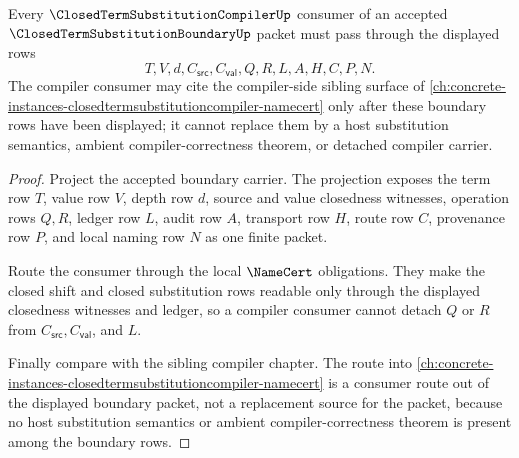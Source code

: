 \begin{theorem}
\label{thm:closed-term-substitution-boundary-compiler-consumer-lock}
Every $\ClosedTermSubstitutionCompilerUp$ consumer of an accepted $\ClosedTermSubstitutionBoundaryUp$ packet must pass through the displayed rows
$$
T,V,d,C_{\mathsf{src}},C_{\mathsf{val}},Q,R,L,A,H,C,P,N.
$$
The compiler consumer may cite the compiler-side sibling surface of \autoref{ch:concrete-instances-closedtermsubstitutioncompiler-namecert} only after these boundary rows have been displayed; it cannot replace them by a host substitution semantics, ambient compiler-correctness theorem, or detached compiler carrier.
\end{theorem}
\begin{proof}
Project the accepted boundary carrier. The projection exposes the term row $T$, value row $V$, depth row $d$, source and value closedness witnesses, operation rows $Q,R$, ledger row $L$, audit row $A$, transport row $H$, route row $C$, provenance row $P$, and local naming row $N$ as one finite packet.

Route the consumer through the local $\NameCert$ obligations. They make the closed shift and closed substitution rows readable only through the displayed closedness witnesses and ledger, so a compiler consumer cannot detach $Q$ or $R$ from $C_{\mathsf{src}},C_{\mathsf{val}}$, and $L$.

Finally compare with the sibling compiler chapter. The route into \autoref{ch:concrete-instances-closedtermsubstitutioncompiler-namecert} is a consumer route out of the displayed boundary packet, not a replacement source for the packet, because no host substitution semantics or ambient compiler-correctness theorem is present among the boundary rows.
\end{proof}

